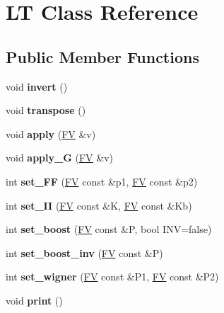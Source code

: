 \hypertarget{classLT}{\section{L\-T Class Reference}
\label{classLT}
}
\subsection*{Public Member Functions}
\begin{DoxyCompactItemize}
\item 
\hypertarget{classLT_a7467f60d847896710f21c17be6ee0b2c}{void {\bfseries invert} ()}\label{classLT_a7467f60d847896710f21c17be6ee0b2c}

\item 
\hypertarget{classLT_a6142dba94f0edc4eb2f8a0cc84a43ada}{void {\bfseries transpose} ()}\label{classLT_a6142dba94f0edc4eb2f8a0cc84a43ada}

\item 
\hypertarget{classLT_a3119b968c2cf6a9bbfb30615c01921d0}{void {\bfseries apply} (\hyperlink{classFV}{F\-V} \&v)}\label{classLT_a3119b968c2cf6a9bbfb30615c01921d0}

\item 
\hypertarget{classLT_abd17d410a8436a83b03f2dd2909ee59a}{void {\bfseries apply\-\_\-\-G} (\hyperlink{classFV}{F\-V} \&v)}\label{classLT_abd17d410a8436a83b03f2dd2909ee59a}

\item 
\hypertarget{classLT_acdccba2ab08b071219626bafb85f8e21}{int {\bfseries set\-\_\-\-F\-F} (\hyperlink{classFV}{F\-V} const \&p1, \hyperlink{classFV}{F\-V} const \&p2)}\label{classLT_acdccba2ab08b071219626bafb85f8e21}

\item 
\hypertarget{classLT_ac2718d29c891a91aa5058dc929ffecdd}{int {\bfseries set\-\_\-\-I\-I} (\hyperlink{classFV}{F\-V} const \&K, \hyperlink{classFV}{F\-V} const \&Kb)}\label{classLT_ac2718d29c891a91aa5058dc929ffecdd}

\item 
\hypertarget{classLT_a0f1f4b9fb6a2b084908abb6bc687cd4f}{int {\bfseries set\-\_\-boost} (\hyperlink{classFV}{F\-V} const \&P, bool I\-N\-V=false)}\label{classLT_a0f1f4b9fb6a2b084908abb6bc687cd4f}

\item 
\hypertarget{classLT_a84cf79cd6014d4ecc645c1dcc0258b5e}{int {\bfseries set\-\_\-boost\-\_\-inv} (\hyperlink{classFV}{F\-V} const \&P)}\label{classLT_a84cf79cd6014d4ecc645c1dcc0258b5e}

\item 
\hypertarget{classLT_a5a8d17a0e9374ba9cef862c1f98a5d62}{int {\bfseries set\-\_\-wigner} (\hyperlink{classFV}{F\-V} const \&P1, \hyperlink{classFV}{F\-V} const \&P2)}\label{classLT_a5a8d17a0e9374ba9cef862c1f98a5d62}

\item 
\hypertarget{classLT_a6687d255d8543565e26ae9bc37b4a414}{void {\bfseries print} ()}\label{classLT_a6687d255d8543565e26ae9bc37b4a414}

\end{DoxyCompactItemize}
